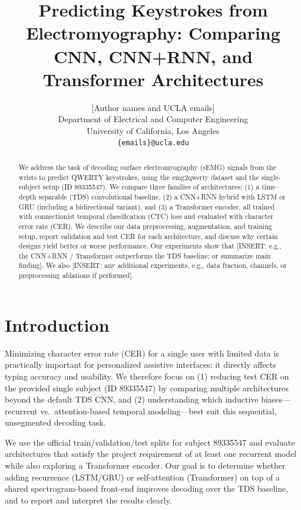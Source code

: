 \documentclass{article}
\title{Predicting Keystrokes from Electromyography: Comparing CNN, CNN+RNN, and Transformer Architectures}
\author{
  [Author names and UCLA emails] \\
  Department of Electrical and Computer Engineering \\
  University of California, Los Angeles \\
  \texttt{\{emails\}@ucla.edu} \\
}
\begin{document}
\maketitle

\begin{abstract}
We address the task of decoding surface electromyography (sEMG) signals from the wrists to predict QWERTY keystrokes, using the emg2qwerty dataset and the single-subject setup (ID 89335547). We compare three families of architectures: (1) a time--depth separable (TDS) convolutional baseline, (2) a CNN+RNN hybrid with LSTM or GRU (including a bidirectional variant), and (3) a Transformer encoder, all trained with connectionist temporal classification (CTC) loss and evaluated with character error rate (CER). We describe our data preprocessing, augmentation, and training setup, report validation and test CER for each architecture, and discuss why certain designs yield better or worse performance. Our experiments show that [INSERT: e.g., the CNN+RNN / Transformer outperforms the TDS baseline; or summarize main finding]. We also [INSERT: any additional experiments, e.g., data fraction, channels, or preprocessing ablations if performed].
\end{abstract}

\section{Introduction}
\label{sec:intro}

Minimizing character error rate (CER) for a single user with limited data is practically important for personalized assistive interfaces: it directly affects typing accuracy and usability. We therefore focus on (1) reducing test CER on the provided single subject (ID 89335547) by comparing multiple architectures beyond the default TDS CNN, and (2) understanding which inductive biases---recurrent vs.\ attention-based temporal modeling---best suit this sequential, unsegmented decoding task.

We use the official train/validation/test splits for subject 89335547 and evaluate architectures that satisfy the project requirement of at least one recurrent model while also exploring a Transformer encoder. Our goal is to determine whether adding recurrence (LSTM/GRU) or self-attention (Transformer) on top of a shared spectrogram-based front-end improves decoding over the TDS baseline, and to report and interpret the results clearly.
\end{document}
